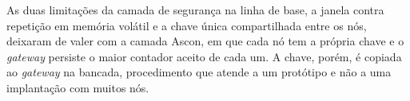 As duas limitações da camada de segurança na linha de base, a janela contra repetição em memória volátil e a chave única compartilhada entre os nós, deixaram de valer com a camada Ascon, em que cada nó tem a própria chave e o \textit{gateway} persiste o maior contador aceito de cada um. A chave, porém, é copiada ao \textit{gateway} na bancada, procedimento que atende a um protótipo e não a uma implantação com muitos nós.


